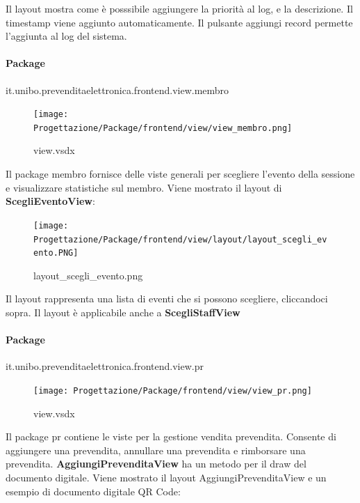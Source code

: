 \documentclass[a4paper]{article}
\begin{document}
Il layout mostra come è posssibile aggiungere la priorità al log, e la descrizione. Il timestamp viene aggiunto automaticamente. Il pulsante aggiungi record permette l'aggiunta al log del sistema.

\newpage

\paragraph{Package} it.unibo.prevenditaelettronica.frontend.view.membro


\begin{figure}[H]
    \texttt{[image: Progettazione/Package/frontend/view/view\_membro.png]}
    \centering
    \caption{view.vsdx}
\end{figure}

Il package membro fornisce delle viste generali per scegliere l'evento della sessione e visualizzare statistiche sul membro. Viene mostrato il layout di \textbf{ScegliEventoView}:

\begin{figure}[H]
    \texttt{[image: Progettazione/Package/frontend/view/layout/layout\_scegli\_evento.PNG]}
    \centering
    \caption{layout\_scegli\_evento.png}
\end{figure}

Il layout rappresenta una lista di eventi che si possono scegliere, cliccandoci sopra. Il layout è applicabile anche a \textbf{ScegliStaffView}

\newpage

\paragraph{Package} it.unibo.prevenditaelettronica.frontend.view.pr


\begin{figure}[H]
    \texttt{[image: Progettazione/Package/frontend/view/view\_pr.png]}
    \centering
    \caption{view.vsdx}
\end{figure}

Il package pr contiene le viste per la gestione vendita prevendita. Consente di aggiungere una prevendita, annullare una prevendita e rimborsare una prevendita. \textbf{AggiungiPrevenditaView} ha un metodo per il draw del documento digitale. Viene mostrato il layout AggiungiPrevenditaView e un esempio di documento digitale QR Code:
\end{document}
